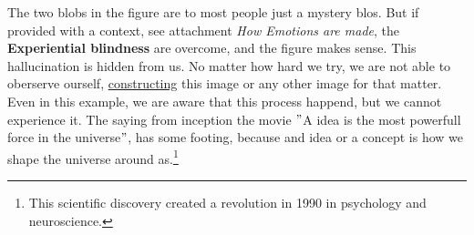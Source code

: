 The two blobs in the figure are to most people just a mystery blos. But if provided with a context, see attachment \textit{How Emotions are made}, the \textbf{Experiential blindness} are overcome, and the figure makes sense. This hallucination is hidden from us. No matter how hard we try, we are not able to oberserve ourself, \underline{constructing} this image or any other image for that matter. Even in this example, we are aware that this process happend, but we cannot experience it. The saying from inception the movie $"$A idea is the most powerfull force in the universe$"$, has some footing, because and idea or a concept is how we shape the universe around as.\footnote{This scientific discovery created a revolution in 1990 in psychology and neuroscience.}\\

